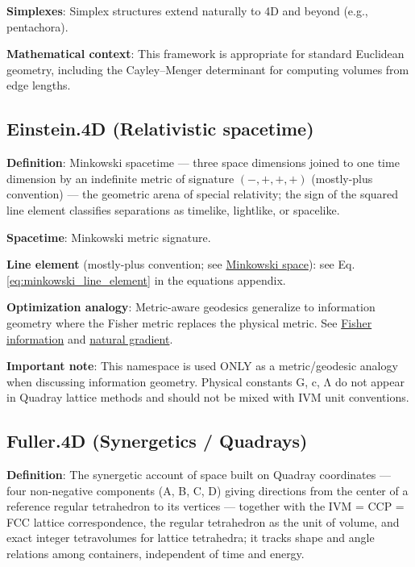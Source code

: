 \documentclass[
  10pt,
]{article}
\begin{document}
\textbf{Simplexes}: Simplex structures extend naturally to 4D and beyond
(e.g., pentachora).

\textbf{Mathematical context}: This framework is appropriate for
standard Euclidean geometry, including the Cayley--Menger determinant
for computing volumes from edge lengths.

\subsection{Einstein.4D (Relativistic
spacetime)}\label{einstein.4d-relativistic-spacetime}

\textbf{Definition}: Minkowski spacetime --- three space dimensions
joined to one time dimension by an indefinite metric of signature
\((-,+,+,+)\) (mostly-plus convention) --- the geometric arena of
special relativity; the sign of the squared line element classifies
separations as timelike, lightlike, or spacelike.

\textbf{Spacetime}: Minkowski metric signature.

\textbf{Line element} (mostly-plus convention; see
\href{https://en.wikipedia.org/wiki/Minkowski_space}{Minkowski space}):
see Eq. \eqref{eq:minkowski_line_element} in the equations appendix.

\textbf{Optimization analogy}: Metric-aware geodesics generalize to
information geometry where the Fisher metric replaces the physical
metric. See
\href{https://en.wikipedia.org/wiki/Fisher_information}{Fisher
information} and
\href{https://en.wikipedia.org/wiki/Natural_gradient}{natural gradient}.

\textbf{Important note}: This namespace is used ONLY as a
metric/geodesic analogy when discussing information geometry. Physical
constants G, c, Λ do not appear in Quadray lattice methods and should
not be mixed with IVM unit conventions.

\subsection{Fuller.4D (Synergetics /
Quadrays)}\label{fuller.4d-synergetics-quadrays}

\textbf{Definition}: The synergetic account of space built on Quadray
coordinates --- four non-negative components (A, B, C, D) giving
directions from the center of a reference regular tetrahedron to its
vertices --- together with the IVM = CCP = FCC lattice correspondence,
the regular tetrahedron as the unit of volume, and exact integer
tetravolumes for lattice tetrahedra; it tracks shape and angle relations
among containers, independent of time and energy.
\end{document}
